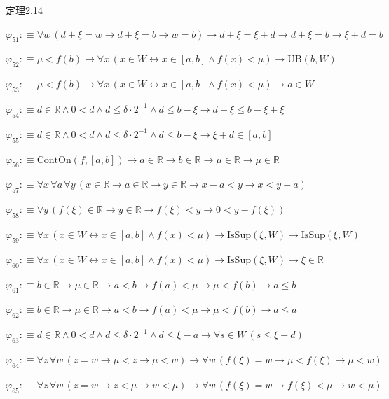 \begin{fullproof}{定理2.14}
\begin{abbrevlist}
\item $\varphi_{51} :\equiv \forall w\,(d + \xi = w \to d + \xi = b \to w = b) \to d + \xi = \xi + d \to d + \xi = b \to \xi + d = b$
\item $\varphi_{52} :\equiv \mu < f(b) \to \forall x\,(x \in W \leftrightarrow x \in [a,b] \land f(x) < \mu) \to \mathrm{UB}(b,W)$
\item $\varphi_{53} :\equiv \mu < f(b) \to \forall x\,(x \in W \leftrightarrow x \in [a,b] \land f(x) < \mu) \to a \in W$
\item $\varphi_{54} :\equiv d \in \mathbb{R} \land 0 < d \land d \leq \delta \cdot 2^{-1} \land d \leq b - \xi \to d + \xi \leq b - \xi + \xi$
\item $\varphi_{55} :\equiv d \in \mathbb{R} \land 0 < d \land d \leq \delta \cdot 2^{-1} \land d \leq b - \xi \to \xi + d \in [a,b]$
\item $\varphi_{56} :\equiv \mathrm{ContOn}(f,[a,b]) \to a \in \mathbb{R} \to b \in \mathbb{R} \to \mu \in \mathbb{R} \to \mu \in \mathbb{R}$
\item $\varphi_{57} :\equiv \forall x\,\forall a\,\forall y\,(x \in \mathbb{R} \to a \in \mathbb{R} \to y \in \mathbb{R} \to x - a < y \to x < y + a)$
\item $\varphi_{58} :\equiv \forall y\,(f(\xi) \in \mathbb{R} \to y \in \mathbb{R} \to f(\xi) < y \to 0 < y - f(\xi))$
\item $\varphi_{59} :\equiv \forall x\,(x \in W \leftrightarrow x \in [a,b] \land f(x) < \mu) \to \mathrm{IsSup}(\xi,W) \to \mathrm{IsSup}(\xi,W)$
\item $\varphi_{60} :\equiv \forall x\,(x \in W \leftrightarrow x \in [a,b] \land f(x) < \mu) \to \mathrm{IsSup}(\xi,W) \to \xi \in \mathbb{R}$
\item $\varphi_{61} :\equiv b \in \mathbb{R} \to \mu \in \mathbb{R} \to a < b \to f(a) < \mu \to \mu < f(b) \to a \leq b$
\item $\varphi_{62} :\equiv b \in \mathbb{R} \to \mu \in \mathbb{R} \to a < b \to f(a) < \mu \to \mu < f(b) \to a \leq a$
\item $\varphi_{63} :\equiv d \in \mathbb{R} \land 0 < d \land d \leq \delta \cdot 2^{-1} \land d \leq \xi - a \to \forall s \in W\,(s \leq \xi - d)$
\item $\varphi_{64} :\equiv \forall z\,\forall w\,(z = w \to \mu < z \to \mu < w) \to \forall w\,(f(\xi) = w \to \mu < f(\xi) \to \mu < w)$
\item $\varphi_{65} :\equiv \forall z\,\forall w\,(z = w \to z < \mu \to w < \mu) \to \forall w\,(f(\xi) = w \to f(\xi) < \mu \to w < \mu)$

\end{abbrevlist}
\end{fullproof}
